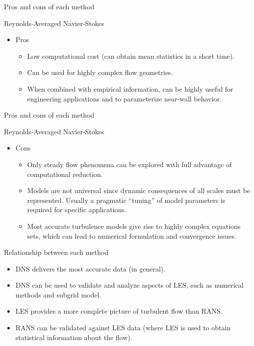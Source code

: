 \begin{frame}{Pros and cons of each method}

Reynolds-Averaged Navier-Stokes
\begin{itemize}
	\item Pros
	\begin{itemize}
		\item Low computational cost (can obtain mean statistics in a short time).
		\item Can be used for highly complex flow geometries.
		\item When combined with empirical information, can be highly useful for engineering applications and to parameterize near-wall behavior.
	\end{itemize}

\end{itemize}
\end{frame}


\begin{frame}{Pros and cons of each method}

Reynolds-Averaged Navier-Stokes
\begin{itemize}
	\item Cons
	\begin{itemize}
		\item Only steady flow phenomena can be explored with full advantage of computational reduction.
		\item Models are not universal since dynamic consequences of all scales must be represented. Usually a pragmatic ``tuning'' of model parameters is required for specific applications.
		\item Most accurate turbulence models give rise to highly complex equations sets, which can lead to numerical formulation and convergence issues.
	\end{itemize}

\end{itemize}
\end{frame}


\begin{frame}{Relationship between each method}

\begin{itemize}
	\item DNS delivers the most accurate data (in general).
	\item DNS can be used to validate and analyze aspects of LES, such as numerical methods and subgrid model.
	\item LES provides a more complete picture of turbulent flow than RANS.
	\item RANS can be validated against LES data (where LES is used to obtain statistical information about the flow).
\end{itemize}
\end{frame}


